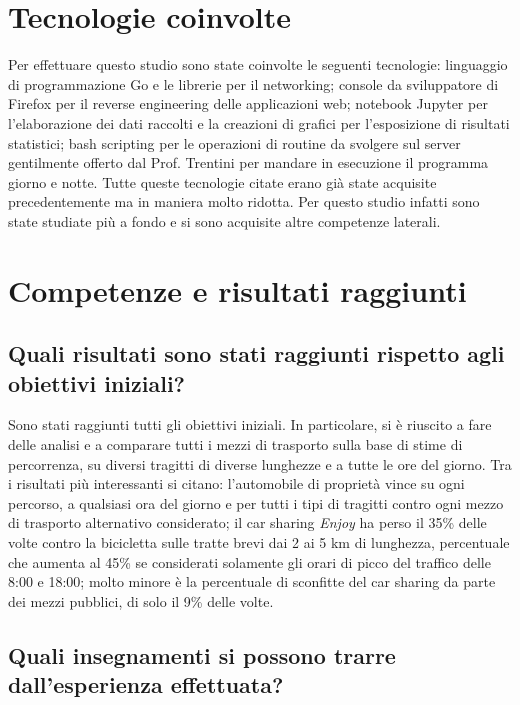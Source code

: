 \documentclass[a4paper,11pt]{article}
\begin{document}
\section{Tecnologie coinvolte}

Per effettuare questo studio sono state coinvolte le seguenti tecnologie: linguaggio di programmazione Go e le librerie per il networking; console da sviluppatore di Firefox per il reverse engineering delle applicazioni web; notebook Jupyter per l'elaborazione dei dati raccolti e la creazioni di grafici per l'esposizione di risultati statistici; bash scripting per le operazioni di routine da svolgere sul server gentilmente offerto dal Prof. Trentini per mandare in esecuzione il programma giorno e notte. Tutte queste tecnologie citate erano già state acquisite precedentemente ma in maniera molto ridotta. Per questo studio infatti sono state studiate più a fondo e si sono acquisite altre competenze laterali.

\section{Competenze e risultati raggiunti}

\subsection{Quali risultati sono stati raggiunti rispetto agli obiettivi iniziali?}

Sono stati raggiunti tutti gli obiettivi iniziali. In particolare, si è riuscito a fare delle analisi e a comparare tutti i mezzi di trasporto sulla base di stime di percorrenza, su diversi tragitti di diverse lunghezze e a tutte le ore del giorno. Tra i risultati più interessanti si citano: l'automobile di proprietà vince su ogni percorso, a qualsiasi ora del giorno e per tutti i tipi di tragitti contro ogni mezzo di trasporto alternativo considerato; il car sharing \textit{Enjoy} ha perso il 35\% delle volte contro la bicicletta sulle tratte brevi dai 2 ai 5 km di lunghezza, percentuale che aumenta al 45\% se considerati solamente gli orari di picco del traffico delle 8:00 e 18:00; molto minore è la percentuale di sconfitte del car sharing da parte dei mezzi pubblici, di solo il 9\% delle volte.

\subsection{Quali insegnamenti si possono trarre dall'esperienza effettuata?}
\end{document}

